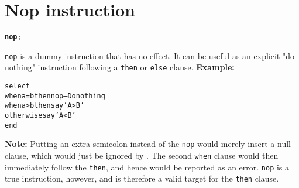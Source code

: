 \chapter{Nop instruction}
\begin{shaded}
\begin{alltt}
\textbf{nop};
\end{alltt}
\end{shaded}
 \texttt{nop} is a dummy instruction that has no effect.  It can be
useful as an explicit "do nothing" instruction following a
\texttt{then} or \texttt{else} clause.
 \textbf{Example:}
\begin{alltt}
select
  when a=b then nop           -- Do nothing
  when a>b then say 'A > B'
  otherwise     say 'A < B'
  end
\end{alltt}
\textbf{Note: }Putting an extra semicolon instead of the \texttt{nop} would
merely insert a null clause, which would just be ignored by \nr{}.
The second \texttt{when} clause would then immediately follow the
\texttt{then}, and hence would be reported as an error.
\texttt{nop} is a true instruction, however, and is therefore a valid
target for the \texttt{then} clause.
